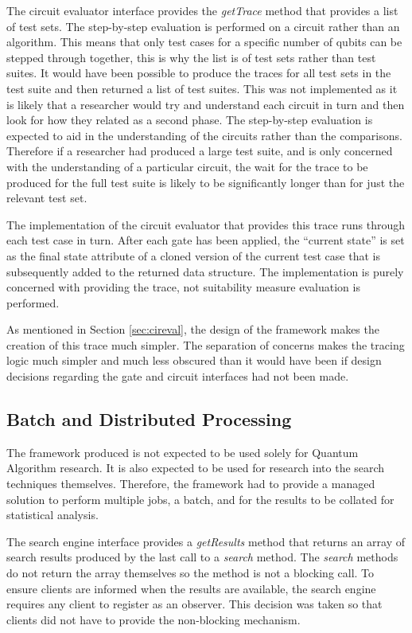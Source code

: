 The circuit evaluator interface provides the \emph{getTrace} method that provides a list of test sets.
The step-by-step evaluation is performed on a circuit rather than an algorithm.
This means that only test cases for a specific number of qubits can be stepped through together, this is why the list is of test sets rather than test suites.
It would have been possible to produce the traces for all test sets in the test suite and then returned a list of test suites.
This was not implemented as it is likely that a researcher would try and understand each circuit in turn and then look for how they related as a second phase.
The step-by-step evaluation is expected to aid in the understanding of the circuits rather than the comparisons.
Therefore if a researcher had produced a large test suite, and is only concerned with the understanding of a particular circuit, the wait for the trace to be produced for the full test suite is likely to be significantly longer than for just the relevant test set.

The implementation of the circuit evaluator that provides this trace runs through each test case in turn.
After each gate has been applied, the ``current state'' is set as the final state attribute of a cloned version of the current test case that is subsequently added to the returned data structure.
The implementation is purely concerned with providing the trace, not suitability measure evaluation is performed.

As mentioned in Section \ref{sec:cireval}, the design of the framework makes the creation of this trace much simpler.
The separation of concerns makes the tracing logic much simpler and much less obscured than it would have been if design decisions regarding the gate and circuit interfaces had not been made.

\subsection{Batch and Distributed Processing}
The framework produced is not expected to be used solely for Quantum Algorithm research.
It is also expected to be used for research into the search techniques themselves.
Therefore, the framework had to provide a managed solution to perform multiple jobs, a batch, and for the results to be collated for statistical analysis.

The search engine interface provides a \emph{getResults} method that returns an array of search results produced by the last call to a \emph{search} method.
The \emph{search} methods do not return the array themselves so the method is not a blocking call.
To ensure clients are informed when the results are available, the search engine requires any client to register as an observer.
This decision was taken so that clients did not have to provide the non-blocking mechanism.

